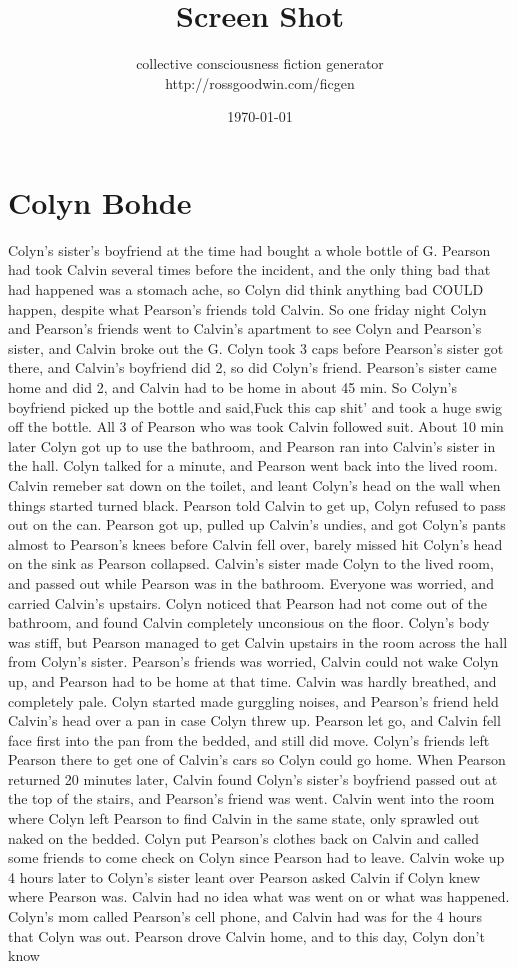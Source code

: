 \documentclass[12pt]{book}
\title{Screen Shot}
\author{collective consciousness fiction generator\\http://rossgoodwin.com/ficgen}
\date{\today}
\begin{document}
\maketitle



\chapter{Colyn Bohde}

Colyn's sister's boyfriend at the time had bought a whole bottle of G. Pearson had took Calvin several times before the incident, and the only thing bad that had happened was a stomach ache, so Colyn did think anything bad COULD happen, despite what Pearson's friends told Calvin. So one friday night Colyn and Pearson's friends went to Calvin's apartment to see Colyn and Pearson's sister, and Calvin broke out the G. Colyn took 3 caps before Pearson's sister got there, and Calvin's boyfriend did 2, so did Colyn's friend. Pearson's sister came home and did 2, and Calvin had to be home in about 45 min. So Colyn's boyfriend picked up the bottle and said,Fuck this cap shit' and took a huge swig off the bottle. All 3 of Pearson who was took Calvin followed suit. About 10 min later Colyn got up to use the bathroom, and Pearson ran into Calvin's sister in the hall. Colyn talked for a minute, and Pearson went back into the lived room. Calvin remeber sat down on the toilet, and leant Colyn's head on the wall when things started turned black. Pearson told Calvin to get up, Colyn refused to pass out on the can. Pearson got up, pulled up Calvin's undies, and got Colyn's pants almost to Pearson's knees before Calvin fell over, barely missed hit Colyn's head on the sink as Pearson collapsed. Calvin's sister made Colyn to the lived room, and passed out while Pearson was in the bathroom. Everyone was worried, and carried Calvin's upstairs. Colyn noticed that Pearson had not come out of the bathroom, and found Calvin completely unconsious on the floor. Colyn's body was stiff, but Pearson managed to get Calvin upstairs in the room across the hall from Colyn's sister. Pearson's friends was worried, Calvin could not wake Colyn up, and Pearson had to be home at that time. Calvin was hardly breathed, and completely pale. Colyn started made gurggling noises, and Pearson's friend held Calvin's head over a pan in case Colyn threw up. Pearson let go, and Calvin fell face first into the pan from the bedded, and still did move. Colyn's friends left Pearson there to get one of Calvin's cars so Colyn could go home. When Pearson returned 20 minutes later, Calvin found Colyn's sister's boyfriend passed out at the top of the stairs, and Pearson's friend was went. Calvin went into the room where Colyn left Pearson to find Calvin in the same state, only sprawled out naked on the bedded. Colyn put Pearson's clothes back on Calvin and called some friends to come check on Colyn since Pearson had to leave. Calvin woke up 4 hours later to Colyn's sister leant over Pearson asked Calvin if Colyn knew where Pearson was. Calvin had no idea what was went on or what was happened. Colyn's mom called Pearson's cell phone, and Calvin had was for the 4 hours that Colyn was out. Pearson drove Calvin home, and to this day, Colyn don't know 
\end{document}
